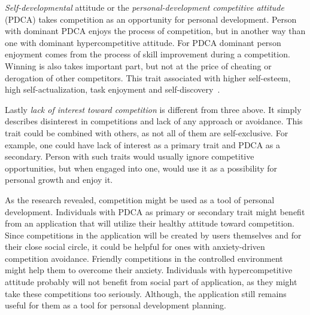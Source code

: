\textit{Self-developmental} attitude or the \textit{personal-development competitive attitude} (PDCA)
takes competition as an opportunity for personal development.
Person with dominant PDCA enjoys the process of competition, but in another way than one with dominant hypercompetitive
attitude.
For PDCA dominant person enjoyment comes from the process of skill improvement during a competition.
Winning is also takes important part, but not at the price of cheating or derogation of other competitors.
This trait associated with higher self-esteem, high self-actualization, task enjoyment and self-discovery~\cite{cit-ryckman-pdca}.

Lastly \textit{lack of interest toward competition} is different from three above.
It simply describes disinterest in competitions and lack of any approach or avoidance.
This trait could be combined with others, as not all of them are self-exclusive.
For example, one could have lack of interest as a primary trait and PDCA as a secondary.
Person with such traits would usually ignore competitive opportunities, but when engaged into one,
would use it as a possibility for personal growth and enjoy it.~\cite{the-four-faces-of-competetition}

As the research revealed, competition might be used as a tool of personal development.
Individuals with PDCA as primary or secondary trait might benefit from an application that will utilize their healthy
attitude toward competition.
Since competitions in the application will be created by users themselves and for their close social circle,
it could be helpful for ones with anxiety-driven competition avoidance.
Friendly competitions in the controlled environment might help them to overcome their anxiety.
Individuals with hypercompetitive attitude probably will not benefit from social part of application,
as they might take these competitions too seriously.
Although, the application still remains useful for them as a tool for personal development planning.